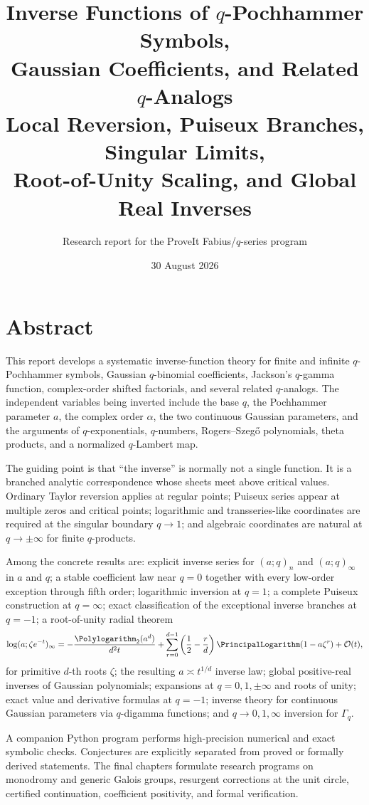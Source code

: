 \documentclass[11pt,oneside]{book}
\title{\Huge Inverse Functions of $q$-Pochhammer Symbols,\\[4pt]
Gaussian Coefficients, and Related $q$-Analogs\\[12pt]
\Large Local Reversion, Puiseux Branches, Singular Limits,\\
Root-of-Unity Scaling, and Global Real Inverses}
\author{Research report for the ProveIt Fabius/$q$-series program}
\date{30 August 2026}
\theoremstyle{definition}
\theoremstyle{remark}
\newcommand{\OO}{\mathcal{O}}
\begin{document}
\hypersetup{pageanchor=false}
\maketitle
\hypersetup{pageanchor=true}
\frontmatter

\chapter*{Abstract}
This report develops a systematic inverse-function theory for finite and
infinite $q$-Pochhammer symbols, Gaussian $q$-binomial coefficients,
Jackson's $q$-gamma function, complex-order shifted factorials, and several
related $q$-analogs.  The independent variables being inverted include the
base $q$, the Pochhammer parameter $a$, the complex order $\alpha$, the two
continuous Gaussian parameters, and the arguments of $q$-exponentials,
$q$-numbers, Rogers--Szeg\H{o} polynomials, theta products, and a normalized
$q$-Lambert map.

The guiding point is that ``the inverse'' is normally not a single function.
It is a branched analytic correspondence whose sheets meet above critical
values.  Ordinary Taylor reversion applies at regular points; Puiseux series
appear at multiple zeros and critical points; logarithmic and transseries-like
coordinates are required at the singular boundary $q\to 1$; and algebraic
coordinates are natural at $q\to\pm\infty$ for finite $q$-products.

Among the concrete results are: explicit inverse series for $(a;q)_n$ and
$(a;q)_\infty$ in $a$ and $q$; a stable coefficient law near $q=0$ together
with every low-order exception through fifth order; logarithmic inversion at
$q=1$; a complete Puiseux construction at $q=\infty$; exact classification of
the exceptional inverse branches at $q=-1$; a root-of-unity radial theorem
\[
 \log(a;\zeta e^{-t})_\infty
 =-\frac{\Polylogarithm_2(a^d)}{d^2t}
 +\sum_{r=0}^{d-1}\left(\frac12-\frac rd\right)
      \PrincipalLogarithm(1-a\zeta^r)+\OO(t),
\]
for primitive $d$-th roots $\zeta$; the resulting $a\asymp t^{1/d}$ inverse
law; global positive-real inverses of Gaussian polynomials; expansions at
$q=0,1,\pm\infty$ and roots of unity; exact value and derivative formulas at
$q=-1$; inverse theory for continuous Gaussian parameters via $q$-digamma
functions; and $q\to0,1,\infty$ inversion for $\Gamma_q$.

A companion Python program performs high-precision numerical and exact
symbolic checks.  Conjectures are explicitly separated from proved or formally
derived statements.  The final chapters formulate research programs on
monodromy and generic Galois groups, resurgent corrections at the unit circle,
certified continuation, coefficient positivity, and formal verification.
\end{document}
